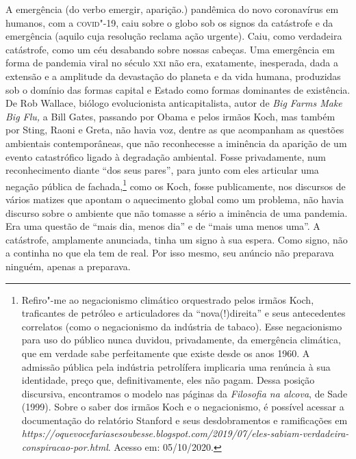 A emergência (do verbo emergir, aparição.) pandêmica do novo coronavírus
em humanos, com a \textsc{covid}"-19, caiu sobre o globo sob os signos da
catástrofe e da emergência (aquilo cuja resolução reclama ação urgente).
Caiu, como verdadeira catástrofe, como um céu desabando sobre nossas
cabeças. Uma emergência em forma de pandemia viral no século \textsc{xxi} não
era, exatamente, inesperada, dada a extensão e a amplitude da devastação
do planeta e da vida humana, produzidas sob o domínio das formas capital
e Estado como formas dominantes de existência. De Rob Wallace, biólogo
evolucionista anticapitalista, autor de \emph{Big Farms Make Big Flu,} a
Bill Gates, passando por Obama e pelos irmãos Koch, mas também por
Sting, Raoni e Greta, não havia voz, dentre as que acompanham as
questões ambientais contemporâneas, que não reconhecesse a iminência da
aparição de um evento catastrófico ligado à degradação ambiental. Fosse
privadamente, num reconhecimento diante ``dos seus pares'', para junto
com eles articular uma negação pública de fachada,\footnote{Refiro"-me ao
  negacionismo climático orquestrado pelos irmãos Koch, traficantes de
  petróleo e articuladores da ``nova(!)direita'' e seus antecedentes
  correlatos (como o negacionismo da indústria de tabaco). Esse
  negacionismo para uso do público nunca duvidou, privadamente, da
  emergência climática, que em verdade sabe perfeitamente que existe
  desde os anos 1960. A admissão pública pela indústria petrolífera
  implicaria uma renúncia à sua identidade, preço que, definitivamente,
  eles não pagam. Dessa posição discursiva, encontramos o modelo nas
  páginas da \emph{Filosofia na alcova}, de Sade (1999). Sobre o saber
  dos irmãos Koch e o negacionismo, é possível acessar a documentação do
  relatório Stanford e seus desdobramentos e ramificações em
  \emph{https://oquevocefariasesoubesse.blogspot.com/2019/07/eles-sabiam-verdadeira-conspiracao-por.html}.
  Acesso em: 05/10/2020.} como os Koch, fosse publicamente, nos
discursos de vários matizes que apontam o aquecimento global como um
problema, não havia discurso sobre o ambiente que não tomasse a sério a
iminência de uma pandemia. Era uma questão de ``mais dia, menos dia'' e
de ``mais uma menos uma''. A catástrofe, amplamente anunciada, tinha um
signo à sua espera. Como signo, não a continha no que ela tem de real.
Por isso mesmo, seu anúncio não preparava ninguém, apenas a preparava.

